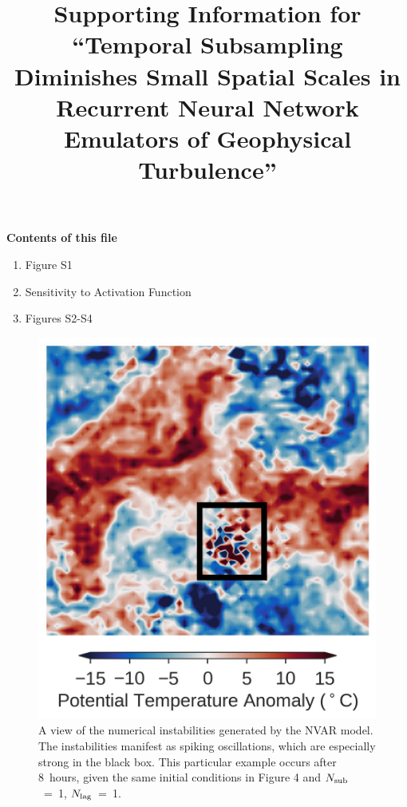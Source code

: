 \documentclass[draft,ms]{agutexSI2019}
\begin{document}
%
%



\title{Supporting Information for ``Temporal Subsampling Diminishes Small Spatial Scales in
    Recurrent Neural Network Emulators of
    Geophysical Turbulence''}


\begin{article}

%
%


\noindent\textbf{Contents of this file}
\begin{enumerate}
    \item Figure S1
    \item Sensitivity to Activation Function
    \item Figures S2-S4
\end{enumerate}
\end{article}
\clearpage

\begin{figure}
    \centering
    \includegraphics[width=.3\textwidth]{figures/nvar_instabilities.jpg}
    \caption{A view of the numerical instabilities generated by the NVAR model.
        The instabilities manifest as spiking oscillations, which are
        especially strong in the black box.
        This particular example occurs after 8~hours, given the same initial
        conditions in Figure 4 and $N_\text{sub}$~=~1, $N_\text{lag}$~=~1.
    }
    \label{fig:nvar_instabilities}
\end{figure}
\end{document}
